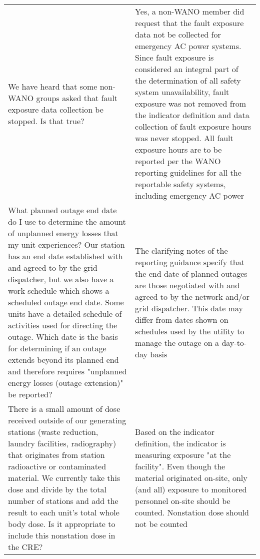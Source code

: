 \begin{longtable}{p{7cm}p{7cm}}
    We have heard that some non-WANO groups asked that fault exposure
  data collection be stopped. Is that true?
& Yes, a non-WANO member did request that the fault exposure data not
  be collected for emergency AC power systems. Since fault exposure is
  considered an integral part of the determination of all safety
  system unavailability, fault exposure was not removed from the
  indicator definition and data collection of fault exposure hours was
  never stopped. All fault exposure hours are to be reported per the
  WANO reporting guidelines for all the reportable safety systems,
  including emergency AC power\\


    What planned outage end date do I use to determine the amount of
  unplanned energy losses that my unit experiences? Our station has an
  end date established with and agreed to by the grid dispatcher, but
  we also have a work schedule which shows a scheduled outage end
  date. Some units have a detailed schedule of activities used for
  directing the outage. Which date is the basis for determining if an
  outage extends beyond its planned end and therefore requires
  "unplanned energy losses (outage extension)" be reported?
& The clarifying notes of the reporting guidance specify that the end
  date of planned outages are those negotiated with and agreed to by
  the network and/or grid dispatcher. This date may differ from dates
  shown on schedules used by the utility to manage the outage on a
  day-to-day basis\\

    There is a small amount of dose received outside of our generating
  stations (waste reduction, laundry facilities, radiography) that
  originates from station radioactive or contaminated material. We
  currently take this dose and divide by the total number of stations
  and add the result to each unit's total whole body dose. Is it
  appropriate to include this nonstation dose in the CRE?
& Based on the indicator definition, the indicator is measuring
  exposure "at the facility". Even though the material originated
  on-site, only (and all) exposure to monitored personnel on-site
  should be counted. Nonstation dose should not be counted\\


\end{longtable}
